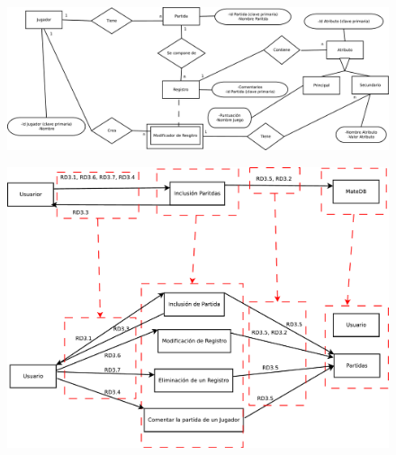 
\begin{figure}
	\centering
	\includegraphics[width=0.7\linewidth]{../Diagramas/pdf/ER-Inclusion.pdf}
	\caption[Diagrama entidad relación del sistema de inclusión]{}
	\caption{}
	\label{fig:ER}
\end{figure}



\begin{figure}
\centering
\includegraphics[width=0.7\linewidth]{../Diagramas/pdf/RefinamientoInclusion.pdf}
\caption[Refinamiento del sistema de inclusión]{}
\caption{}
\label{fig:RefinamientoInclusion}
\end{figure}
